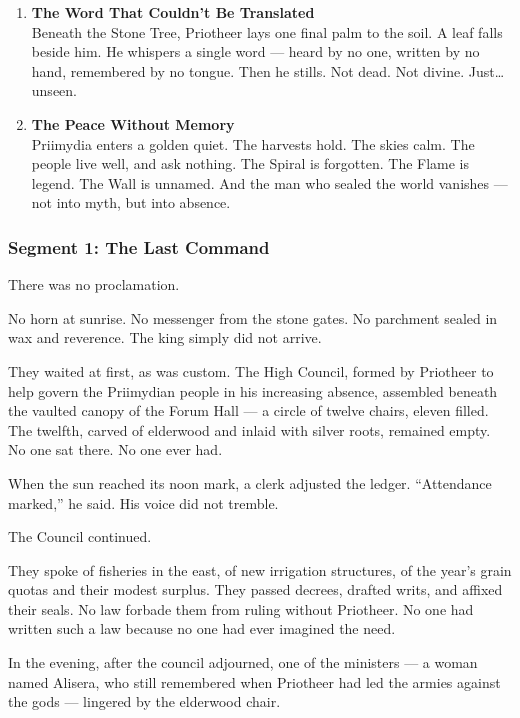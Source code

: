 \documentclass[9pt]{article}
\begin{document}
\begin{enumerate}
    \vspace{1em}
    \item \textbf{The Word That Couldn’t Be Translated} \\
    Beneath the Stone Tree, Priotheer lays one final palm to the soil. A leaf falls beside him. He whispers a single word — heard by no one, written by no hand, remembered by no tongue. Then he stills. Not dead. Not divine. Just… unseen.

    \vspace{1em}
    \item \textbf{The Peace Without Memory} \\
    Priimydia enters a golden quiet. The harvests hold. The skies calm. The people live well, and ask nothing. The Spiral is forgotten. The Flame is legend. The Wall is unnamed. And the man who sealed the world vanishes — not into myth, but into absence.

\end{enumerate}



\newpage

\subsubsection*{Segment 1: The Last Command}

There was no proclamation.

No horn at sunrise. No messenger from the stone gates. No parchment sealed in wax and reverence. The king simply did not arrive.

They waited at first, as was custom. The High Council, formed by Priotheer to help govern the Priimydian people in his increasing absence, assembled beneath the vaulted canopy of the Forum Hall — a circle of twelve chairs, eleven filled. The twelfth, carved of elderwood and inlaid with silver roots, remained empty. No one sat there. No one ever had.

When the sun reached its noon mark, a clerk adjusted the ledger. “Attendance marked,” he said. His voice did not tremble.

The Council continued.

They spoke of fisheries in the east, of new irrigation structures, of the year’s grain quotas and their modest surplus. They passed decrees, drafted writs, and affixed their seals. No law forbade them from ruling without Priotheer. No one had written such a law because no one had ever imagined the need.

In the evening, after the council adjourned, one of the ministers — a woman named Alisera, who still remembered when Priotheer had led the armies against the gods — lingered by the elderwood chair.
\end{document}
